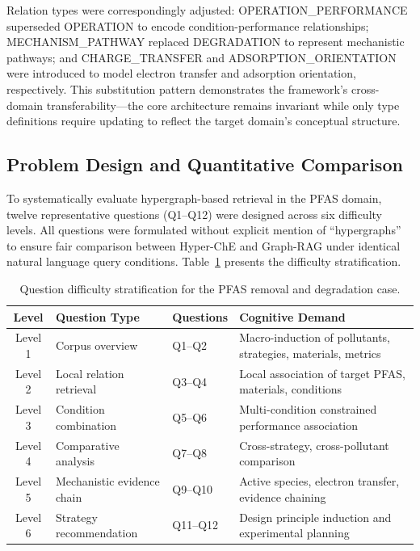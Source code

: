\documentclass[11pt,a4paper]{article}
\begin{document}
Relation types were correspondingly adjusted: OPERATION\_PERFORMANCE superseded OPERATION to encode condition-performance relationships; MECHANISM\_PATHWAY replaced DEGRADATION to represent mechanistic pathways; and CHARGE\_TRANSFER and ADSORPTION\_ORIENTATION were introduced to model electron transfer and adsorption orientation, respectively. This substitution pattern demonstrates the framework's cross-domain transferability---the core architecture remains invariant while only type definitions require updating to reflect the target domain's conceptual structure.

\subsection{Problem Design and Quantitative Comparison}

To systematically evaluate hypergraph-based retrieval in the PFAS domain, twelve representative questions (Q1--Q12) were designed across six difficulty levels. All questions were formulated without explicit mention of ``hypergraphs'' to ensure fair comparison between Hyper-ChE and Graph-RAG under identical natural language query conditions. Table~\ref{tab:pfas_question_levels} presents the difficulty stratification.

\begin{table}[htbp]
\centering
\caption{Question difficulty stratification for the PFAS removal and degradation case.}
\label{tab:pfas_question_levels}
\begin{tabular}{@{}clll@{}}
\toprule
\textbf{Level} & \textbf{Question Type} & \textbf{Questions} & \textbf{Cognitive Demand} \\
\midrule
Level 1 & Corpus overview & Q1--Q2 & Macro-induction of pollutants, strategies, materials, metrics \\
Level 2 & Local relation retrieval & Q3--Q4 & Local association of target PFAS, materials, conditions \\
Level 3 & Condition combination & Q5--Q6 & Multi-condition constrained performance association \\
Level 4 & Comparative analysis & Q7--Q8 & Cross-strategy, cross-pollutant comparison \\
Level 5 & Mechanistic evidence chain & Q9--Q10 & Active species, electron transfer, evidence chaining \\
Level 6 & Strategy recommendation & Q11--Q12 & Design principle induction and experimental planning \\
\bottomrule
\end{tabular}
\end{table}
\end{document}
